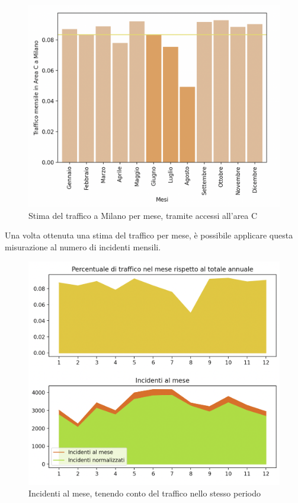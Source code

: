 \documentclass[a4paper]{report}
\begin{document}
\begin{figure}
    \includegraphics[width=\linewidth]{../src/area_c/stima_traffico_mensile.png}
    \caption{Stima del traffico a Milano per mese, tramite accessi all'area C}
    \label{fig:stima-traffico-mensile}
\end{figure}

Una volta ottenuta una stima del traffico per mese, è possibile applicare questa misurazione 
al numero di incidenti mensili.

\begin{figure}
    \includegraphics[width=\linewidth]{../src/area_c/incidenti_traffico_mese.png}
    \caption{Incidenti al mese, tenendo conto del traffico nello stesso periodo}
    \label{fig:incidenti-traffico-mese}
\end{figure}
\end{document}
